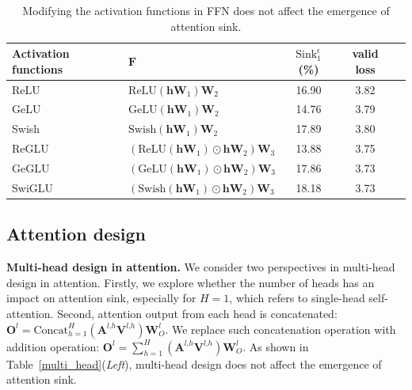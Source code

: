\begin{table}[htbp]
\caption{Modifying the activation functions in FFN does not affect the emergence of attention sink.}
\vspace{-.2cm}
\begin{center}
\begin{tabular}{l|lccc}
\toprule
Activation functions & $\boldsymbol{F}$ & $\textrm{Sink}_1^{\epsilon}$(\%)  & valid loss \\
\midrule
ReLU & $\textrm{ReLU}(\boldsymbol{h}\boldsymbol{W}_1)\boldsymbol{W}_2$ & 16.90 &  3.82\\
GeLU~\citep{hendrycks2016gaussian} & $\textrm{GeLU}(\boldsymbol{h}\boldsymbol{W}_1)\boldsymbol{W}_2$ & 14.76   &  3.79 \\
Swish~\citep{ramachandran2017searching} & $\textrm{Swish}(\boldsymbol{h}\boldsymbol{W}_1)\boldsymbol{W}_2$ &  17.89 & 3.80 \\
ReGLU~\citep{shazeer2020glu} & $\left(\textrm{ReLU}(\boldsymbol{h}\boldsymbol{W}_1)\odot\boldsymbol{h}\boldsymbol{W}_2\right)\boldsymbol{W}_3$ & 13.88  & 3.75\\
GeGLU~\citep{shazeer2020glu} & $\left(\textrm{GeLU}(\boldsymbol{h}\boldsymbol{W}_1)\odot\boldsymbol{h}\boldsymbol{W}_2\right)\boldsymbol{W}_3$ &  17.86 & 3.73\\
SwiGLU~\citep{shazeer2020glu} & $\left(\textrm{Swish}(\boldsymbol{h}\boldsymbol{W}_1)\odot\boldsymbol{h}\boldsymbol{W}_2\right)\boldsymbol{W}_3$ &  18.18 & 3.73\\
\bottomrule
\end{tabular}
\end{center}
\vspace{-.2cm}
\label{activation}
\end{table}

\subsection{Attention design}

\textbf{Multi-head design in attention.} We consider two perspectives in multi-head design in attention. Firstly, we explore whether the number of heads has an impact on attention sink, especially for $H=\textrm{1}$, which refers to single-head self-attention. Second, attention output from each head is concatenated: $\boldsymbol{O}^l=\textrm{Concat}_{h=1}^H\left(\boldsymbol{A}^{l\textrm{,}h}\boldsymbol{V}^{l\textrm{,}h}\right)\boldsymbol{W}_{O}^l$. We replace such concatenation operation with addition operation: $\boldsymbol{O}^l=\sum_{h=1}^H\left(\boldsymbol{A}^{l\textrm{,}h}\boldsymbol{V}^{l\textrm{,}h}\right)\boldsymbol{W}_{O}^l$. As shown in Table~\ref{multi_head}(\emph{Left}), multi-head design does not affect the emergence of attention sink.

